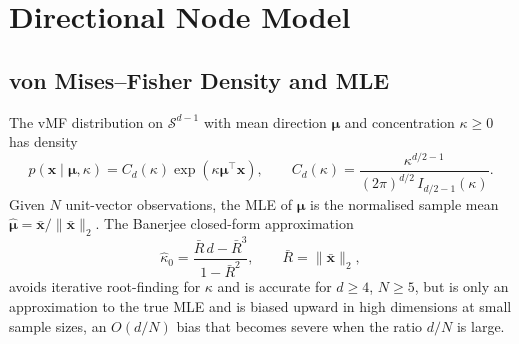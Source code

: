 \section{Directional Node Model}\label{sec:meth-vmf}

\subsection{von Mises--Fisher Density and MLE}

The vMF distribution on $\mathcal{S}^{d-1}$ with mean direction
$\boldsymbol{\mu}$ and concentration $\kappa \geq 0$ has density
\[
p(\mathbf{x} \mid \boldsymbol{\mu}, \kappa)
= C_d(\kappa) \exp\!\left(\kappa \boldsymbol{\mu}^\top \mathbf{x}\right),
\qquad
C_d(\kappa) = \frac{\kappa^{d/2 - 1}}{(2\pi)^{d/2}\, I_{d/2 - 1}(\kappa)}.
\]
Given $N$ unit-vector observations, the MLE of $\boldsymbol{\mu}$ is
the normalised sample mean $\hat{\boldsymbol{\mu}} =
\bar{\mathbf{x}} / \|\bar{\mathbf{x}}\|_2$.
The Banerjee closed-form approximation~\parencite{banerjee2005vmf}
\[
\hat{\kappa}_{0}
= \frac{\bar{R}\, d - \bar{R}^3}{1 - \bar{R}^2},
\qquad \bar{R} = \|\bar{\mathbf{x}}\|_2,
\]
avoids iterative root-finding for $\kappa$ and is accurate for
$d \geq 4$, $N \geq 5$, but is only an approximation to the true MLE
and is biased upward in high dimensions at
small sample sizes, an $O(d/N)$ bias that becomes severe when the
ratio $d/N$ is large.

